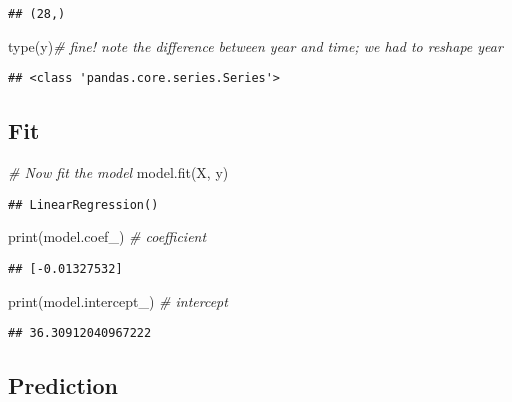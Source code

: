 \documentclass[
]{book}
\newenvironment{Shaded}{\begin{snugshade}}{\end{snugshade}}
\newcommand{\BuiltInTok}[1]{#1}
\newcommand{\CommentTok}[1]{\textcolor[rgb]{0.56,0.35,0.01}{\textit{#1}}}
\newcommand{\NormalTok}[1]{#1}
\begin{document}
\begin{verbatim}
## (28,)
\end{verbatim}

\begin{Shaded}
\begin{Highlighting}[]
\BuiltInTok{type}\NormalTok{(y)}\CommentTok{\# fine! note the difference between year and time; we had to reshape year}
\end{Highlighting}
\end{Shaded}

\begin{verbatim}
## <class 'pandas.core.series.Series'>
\end{verbatim}

\hypertarget{fit}{%
\subsection{Fit}\label{fit}}

\begin{Shaded}
\begin{Highlighting}[]
\CommentTok{\# Now fit the model}
\NormalTok{model.fit(X, y)}
\end{Highlighting}
\end{Shaded}

\begin{verbatim}
## LinearRegression()
\end{verbatim}

\begin{Shaded}
\begin{Highlighting}[]
\BuiltInTok{print}\NormalTok{(model.coef\_) }\CommentTok{\# coefficient}
\end{Highlighting}
\end{Shaded}

\begin{verbatim}
## [-0.01327532]
\end{verbatim}

\begin{Shaded}
\begin{Highlighting}[]
\BuiltInTok{print}\NormalTok{(model.intercept\_) }\CommentTok{\# intercept}
\end{Highlighting}
\end{Shaded}

\begin{verbatim}
## 36.30912040967222
\end{verbatim}

\hypertarget{prediction}{%
\subsection{Prediction}\label{prediction}}
\end{document}
